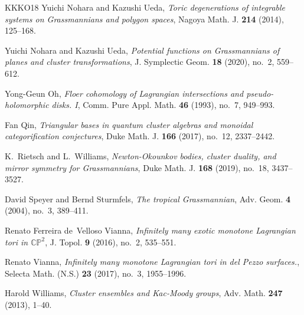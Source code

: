 \documentclass[11pt]{amsart}
\numberwithin{equation}{section}
\theoremstyle{plain}
\theoremstyle{definition}
\numberwithin{equation}{section}
\begin{document}
\begin{thebibliography}{KKKO18}
Yuichi Nohara and Kazushi Ueda, \emph{Toric degenerations of integrable systems on Grassmannians and polygon spaces}, Nagoya Math. J. {\bf 214} (2014), 125--168.

Yuichi Nohara and Kazushi Ueda, \emph{Potential functions on Grassmannians of planes and cluster transformations}, J. Symplectic Geom. {\bf 18} (2020), no.~2, 559--612.

Yong-Geun Oh, \emph{Floer cohomology of {L}agrangian intersections and
  pseudo-holomorphic disks. {I}},
  Comm. Pure Appl. Math. \textbf{46} (1993), no.~7, 949--993. 
  

Fan Qin, \emph{Triangular bases in quantum cluster algebras and monoidal
  categorification conjectures}, Duke Math. J. \textbf{166} (2017), no.~12,
  2337--2442. 

K.~Rietsch and L.~Williams, \emph{Newton-{O}kounkov bodies, cluster duality,
  and mirror symmetry for {G}rassmannians}, Duke Math. J. \textbf{168} (2019),
  no.~18, 3437--3527. 

David Speyer and Bernd Sturmfels, \emph{The tropical Grassmannian}, Adv. Geom. {\bf 4} (2004), no.~3, 389--411.
  
Renato Ferreira de~Velloso Vianna, \emph{Infinitely many exotic monotone
  {L}agrangian tori in {$\mathbb{CP}^2$}}, J. Topol. \textbf{9} (2016), no.~2,
  535--551. 

Renato Vianna, \emph{Infinitely many monotone Lagrangian tori in del Pezzo surfaces.}, Selecta Math. (N.S.) \textbf{23} (2017), no.~3, 1955--1996.

Harold Williams, \emph{Cluster ensembles and {K}ac-{M}oody groups}, Adv. Math.
  \textbf{247} (2013), 1--40. 

\end{thebibliography}
\end{document}
